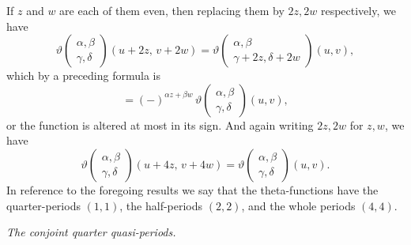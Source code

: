 \documentclass[11pt]{article}
\begin{document}
If $z$ and $w$ are each of them even, then replacing them by $2z, 2w$ respectively, we have
\[
\vartheta\!\begin{pmatrix} \alpha,\beta \\ \gamma,\delta \end{pmatrix}\!(u + 2z,\, v + 2w) = \vartheta\!\begin{pmatrix} \alpha,\beta \\ \gamma + 2z,\delta + 2w \end{pmatrix}\!(u,v),
\]
which by a preceding formula is
\[
= (-)^{\alpha z + \beta w}\,\vartheta\!\begin{pmatrix} \alpha,\beta \\ \gamma,\delta \end{pmatrix}\!(u,v),
\]
or the function is altered at most in its sign. And again writing $2z, 2w$ for $z,w$, we have
\[
\vartheta\!\begin{pmatrix} \alpha,\beta \\ \gamma,\delta \end{pmatrix}\!(u + 4z,\, v + 4w) = \vartheta\!\begin{pmatrix} \alpha,\beta \\ \gamma,\delta \end{pmatrix}\!(u,v).
\]
In reference to the foregoing results we say that the theta-functions have the quarter-periods $(1,1)$, the half-periods $(2,2)$, and the whole periods $(4,4)$.

\medskip

\textit{The conjoint quarter quasi-periods.}

\medskip
\end{document}
